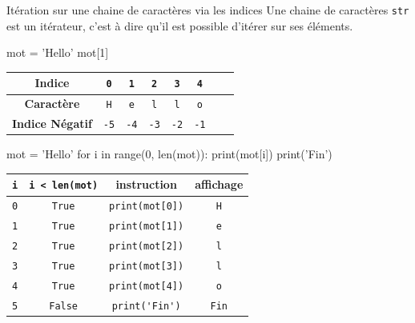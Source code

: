 	
	\begin{easybox}{Itération sur une chaine de caractères via les indices}{}
	Une chaine de caractères \verb+str+ est un itérateur, c'est à dire qu'il est possible d'itérer sur ses éléments.
	
	\begin{minipage}[b]{0.48\linewidth}
		\begin{ConsolePythontex}[Label=false]{}
	mot = 'Hello'
	mot[1]
			\end{ConsolePythontex}
	\end{minipage}\hfill
	\begin{minipage}[b]{0.48\linewidth}
		\begin{center}
			\begin{tabular}{|c|c|c|c|c|c|c|c|}
			\hline
			\textbf{Indice} & \verb+0+ & \verb+1+ & \verb+2+ & \verb+3+ & \verb+4+ \\
			\hline
			\textbf{Caractère} & \verb+H+ & \verb+e+ & \verb+l+ & \verb+l+ & \verb+o+  \\
			\hline
			\textbf{Indice Négatif} & \verb+-5+ & \verb+-4+ & \verb+-3+ & \verb+-2+ & \verb+-1+ \\
			\hline
			\end{tabular}
		\end{center}
	\end{minipage}
	

	\begin{minipage}{0.48\linewidth}
	\medskip
	\begin{CodePythontexAlt}[Largeur=1\linewidth,Centre,PremLigne=1]{}
	mot = 'Hello'
	for i in range(0, len(mot)):
		print(mot[i])
	print('Fin')
			
	\end{CodePythontexAlt}
	\end{minipage}\hfill
	\begin{minipage}{0.48\linewidth}
		\begin{center}
			\renewcommand{\arraystretch}{1}
			\begin{tabular}{|c|c|c|c|}
				\hline
				\verb+i+  & \verb+i < len(mot)+ & instruction & affichage \\ \hline{}
				\verb+0+  & \verb+True+ & \verb+print(mot[0])+ & \verb+H+ \\ \hline{}
				\verb+1+  & \verb+True+ & \verb+print(mot[1])+ & \verb+e+ \\ \hline{}
				\verb+2+  & \verb+True+ & \verb+print(mot[2])+ & \verb+l+ \\ \hline{}
				\verb+3+  & \verb+True+ & \verb+print(mot[3])+ & \verb+l+ \\ \hline{}
				\verb+4+  & \verb+True+ & \verb+print(mot[4])+ & \verb+o+ \\ \hline{}
				\verb+5+  & \verb+False+ & \verb+print('Fin')+ & \verb+Fin+ \\ \hline
			\end{tabular}	
			\end{center}
	\end{minipage}
	\end{easybox}
	
